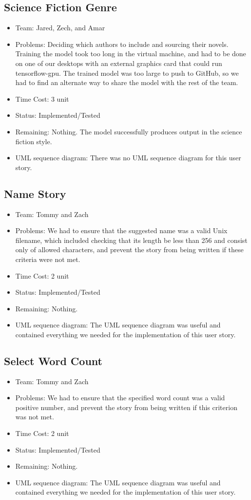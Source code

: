 \documentclass[12pt]{article}
\begin{document}
\subsection{Science Fiction Genre}
\begin{itemize}
\item Team: Jared, Zech, and Amar
\item Problems: Deciding which authors to include and sourcing their novels. Training the model took too long in the virtual machine, and had to be done on one of our desktops with an external graphics card that could run tensorflow-gpu. The trained model was too large to push to GitHub, so we had to find an alternate way to share the model with the rest of the team.
\item Time Cost: 3 unit 
\item Status: Implemented/Tested
\item Remaining: Nothing. The model successfully produces output in the science fiction style.
\item UML sequence diagram: There was no UML sequence diagram for this user story.
\end{itemize}

\subsection{Name Story}
\begin{itemize}
\item Team: Tommy and Zach
\item Problems: We had to ensure that the suggested name was a valid Unix filename, which included checking that its length be less than 256 and consist only of allowed characters, and prevent the story from being written if these criteria were not met.
\item Time Cost:  2 unit
\item Status: Implemented/Tested
\item Remaining: Nothing.
\item UML sequence diagram: The UML sequence diagram was useful and contained everything we needed for the implementation of this user story.
\end{itemize}

\subsection{Select Word Count}
\begin{itemize}
\item Team: Tommy and Zach
\item Problems: We had to ensure that the specified word count was a valid positive number, and prevent the story from being written if this criterion was not met.
\item Time Cost: 2 unit 
\item Status: Implemented/Tested
\item Remaining: Nothing.
\item UML sequence diagram: The  UML sequence diagram was useful and contained everything we needed for the implementation of this user story.
\end{itemize}
\end{document}
